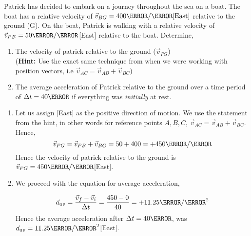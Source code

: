 \documentclass[12pt]{article} %
\newcommand{\tx}[1]{\text{#1}}
\begin{document}
 \begin{qstn}[7]
    Patrick has decided to embark on a journey throughout the sea on a boat. The boat has a relative velocity of $\vec v_{BG} = 400 \m / \s\tx{[East]}$ relative to the ground (G). On the boat, Patrick is walking with a relative velocity of $\vec v_{PB} = 50 \m / \s$[East] relative to the boat. Determine,
    \begin{enumerate}[label = (\alph*)]
        \item The velocity of patrick relative to the ground ($\vec v_{PG}$)\\
        (\textbf{Hint: }Use the exact same technique from when we were working with position vectors, i.e $\vec v_{AC} = \vec v_{AB} + \vec v_{BC}$)
        \item The average acceleration of Patrick relative to the ground over a time period of $\Delta t = 40\s$ if everything was \emph{initially} at rest.

    \end{enumerate}

    \begin{soln}

    \begin{enumerate}[label = (\alph*)]
        \item Let us assign [East] as the positive direction of motion. We use the statement from the hint, in other words for reference points $A,B,C$, $\vec v_{AC} = \vec v_{AB} + \vec v_{BC}$. Hence,
        $$\vec v_{PG} = \vec v_{PB} + \vec v_{BG} = 50 + 400 = +450 \m / \s$$
        Hence the velocity of patrick relative to the ground is $\vec v_{PG} = 450\m / \s$[East].
        \item We proceed with the equation for average acceleration,

        $$\vec a_{av} = \frac{\vec v_f - \vec v_i}{\Delta t} = \frac{450 - 0}{40} = +11.25 \m / \s^2$$
        Hence the average acceleration after $\Delta t  = 40\s$, was $\vec a_{av} = 11.25 \m / \s^2$[East].

    \end{enumerate}


    \end{soln}

 \end{qstn}
\end{document}
